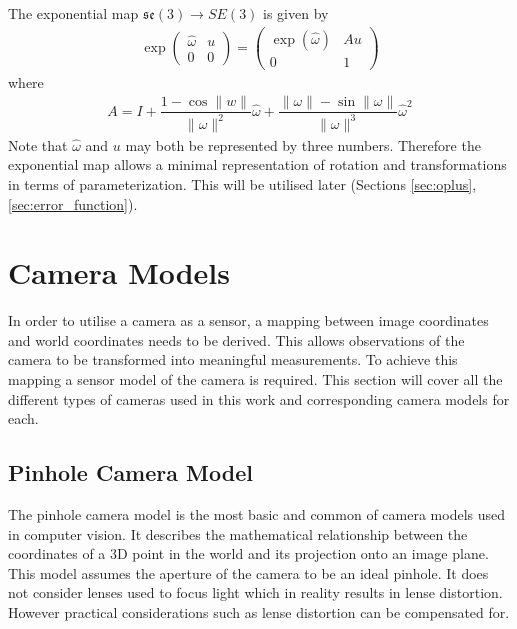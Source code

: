 The exponential map $\mathfrak{se}(3) \to SE(3)$ is given by
\begin{align}
 \exp\left(\begin{array}{cc}
             \hat\omega & u \\
             0 & 0  
           \end{array} \right) 
=
  \left(\begin{array}{cc}
          \exp(\hat\omega) & Au \\
          0 & 1 
        \end{array} \right)
\end{align}
where
\begin{align}
 A = I + \dfrac{1 - \cos\|w\|}{\|\omega\|^2}\hat\omega 
          + \dfrac{\|\omega\| - \sin\|\omega\|}
                  {\|\omega\|^3}\hat\omega^2
\end{align}
Note that $\hat\omega$ and $u$ may both be represented by three numbers.  Therefore the exponential map allows a minimal representation of rotation and transformations in terms of parameterization.  This will be utilised later (Sections \ref{sec:oplus}, \ref{sec:error_function}).

\section{Camera Models}
\label{sec:camera_models}
In order to utilise a camera as a sensor, a mapping between image coordinates and world coordinates needs to be derived.  This allows observations of the camera to be transformed into meaningful measurements.  To achieve this mapping a sensor model of the camera is required. This section will cover all the different types of cameras used in this work and corresponding camera models for each. 

\subsection{Pinhole Camera Model}
\label{subsec:pinhole_cam}

The pinhole camera model is the most basic and common of camera models used in computer vision.  It describes the mathematical relationship between the coordinates of a 3D point in the world and its projection onto an image plane.  This model assumes the aperture of the camera to be an ideal pinhole. It does not consider lenses used to focus light which in reality results in lense distortion.  However practical considerations such as lense distortion can be compensated for.

